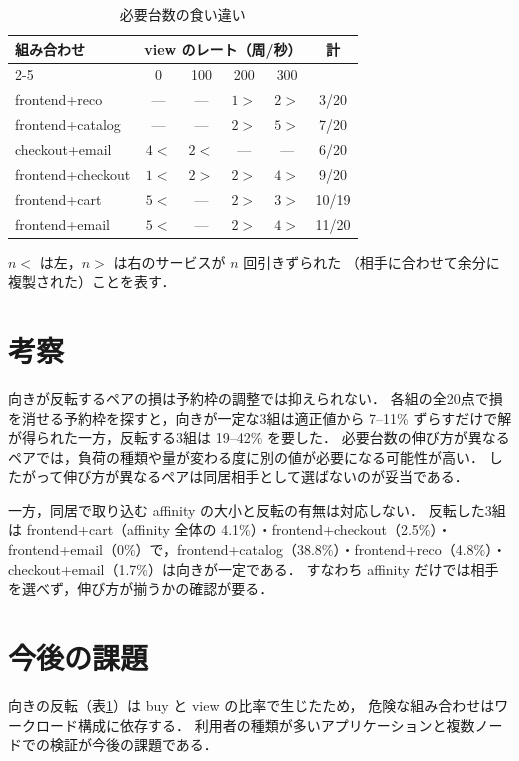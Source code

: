 \documentclass[T,J]{fose}
\begin{document}
\begin{table}[tb]
	\centering
	\caption{必要台数の食い違い}
	\label{table:pairs}
	\footnotesize
	\doublerulesep=0.3pt
	\setlength{\tabcolsep}{3pt}
	\begin{tabular}{lccccc}
		\hline\hline\hline
		組み合わせ & \multicolumn{4}{c}{view のレート（周/秒）} & 計 \\ \cline{2-5}
		                  & 0 & 100 & 200 & 300 & \\ \hline
		frontend+reco     & --- & --- & $1{>}$ & $2{>}$ & 3/20 \\
		frontend+catalog  & --- & --- & $2{>}$ & $5{>}$ & 7/20 \\
		checkout+email    & $4{<}$ & $2{<}$ & --- & --- & 6/20 \\ \hline
		frontend+checkout & $1{<}$ & $2{>}$ & $2{>}$ & $4{>}$ & 9/20 \\
		frontend+cart     & $5{<}$ & --- & $2{>}$ & $3{>}$ & 10/19 \\
		frontend+email    & $5{<}$ & --- & $2{>}$ & $4{>}$ & 11/20 \\ \hline
	\end{tabular}

	{\footnotesize $n{<}$ は左，$n{>}$ は右のサービスが $n$ 回引きずられた
	（相手に合わせて余分に複製された）ことを表す．}
\end{table}

\section{考察}

向きが反転するペアの損は予約枠の調整では抑えられない．
各組の全20点で損を消せる予約枠を探すと，向きが一定な3組は適正値から
7--11\% ずらすだけで解が得られた一方，反転する3組は 19--42\% を要した．
必要台数の伸び方が異なるペアでは，負荷の種類や量が変わる度に別の値が必要になる可能性が高い．
したがって伸び方が異なるペアは同居相手として選ばないのが妥当である．

一方，同居で取り込む affinity の大小と反転の有無は対応しない．
反転した3組は frontend+cart（affinity 全体の 4.1\%）・frontend+checkout（2.5\%）・
frontend+email（0\%）で，frontend+catalog（38.8\%）・frontend+reco（4.8\%）・
checkout+email（1.7\%）は向きが一定である．
すなわち affinity だけでは相手を選べず，伸び方が揃うかの確認が要る．


\section{今後の課題}

向きの反転（表\ref{table:pairs}）は buy と view の比率で生じたため，
危険な組み合わせはワークロード構成に依存する．
利用者の種類が多いアプリケーションと複数ノードでの検証が今後の課題である．



\end{document}

